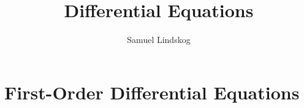 \documentclass[nobib,notoc]{tufte-handout}
\begin{document}
\theoremstyle{definition}\newtheorem{defi}{Definition}[section]
\theoremstyle{definition}\newtheorem{axiom}{Axiom}[section]
\theoremstyle{definition}\newtheorem{thm}{Theorem}[section]
\theoremstyle{definition}\newtheorem{cor}{Corollary}[section]
\theoremstyle{definition}\newtheorem{lem}{Lemma}[section]
\theoremstyle{remark}\newtheorem*{notat}{Notation}
\theoremstyle{remark}\newtheorem*{rema}{Remark}
\theoremstyle{definition}\newtheorem{problem}{Problem}
\newenvironment{prob}[1]{\protect\setcounter{problem}{#1}\addtocounter{problem}{-1}\begin{problem}}{\end{problem}}

\title{Differential Equations}
\author{Samuel Lindskog}
\maketitle

\setcounter{section}{1}

\section{First-Order Differential Equations}
\end{document}
